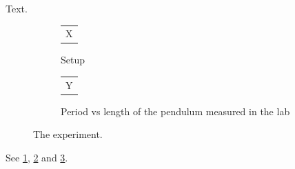 \documentclass{article}
\begin{document}
Text.
\begin{figure}[h]
\centering
\begin{subfigure}{0.45\textwidth}
\centering
\begin{tabular}{c}X\end{tabular}
\caption{Setup}
\label{fig:s}
\end{subfigure}
\begin{subfigure}{0.45\textwidth}
\begin{tabular}{c}Y\end{tabular}
\caption[Short]{Period vs length of the pendulum measured in the lab}
\label{fig:t}
\end{subfigure}
\caption{The experiment.}
\label{fig:e}
\end{figure}
See \ref{fig:s}, \ref{fig:t} and \ref{fig:e}.
\end{document}
